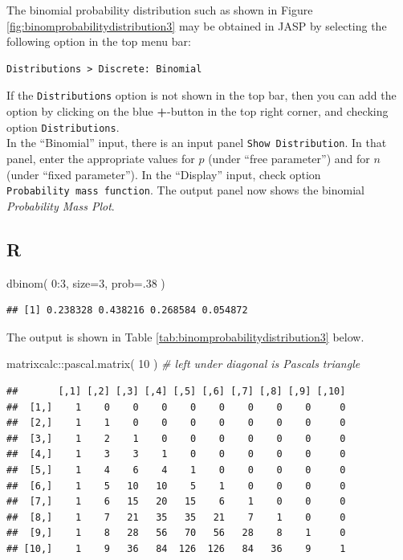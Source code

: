 \documentclass[
]{book}
\newenvironment{Shaded}{\begin{snugshade}}{\end{snugshade}}
\newcommand{\AttributeTok}[1]{\textcolor[rgb]{0.77,0.63,0.00}{#1}}
\newcommand{\CommentTok}[1]{\textcolor[rgb]{0.56,0.35,0.01}{\textit{#1}}}
\newcommand{\DecValTok}[1]{\textcolor[rgb]{0.00,0.00,0.81}{#1}}
\newcommand{\FunctionTok}[1]{\textcolor[rgb]{0.00,0.00,0.00}{#1}}
\newcommand{\NormalTok}[1]{#1}
\newcommand{\SpecialCharTok}[1]{\textcolor[rgb]{0.00,0.00,0.00}{#1}}
\begin{document}
The binomial probability distribution such as shown in Figure \ref{fig:binomprobabilitydistribution3} may be obtained in JASP by selecting the following option in the top menu bar:

\begin{verbatim}
Distributions > Discrete: Binomial
\end{verbatim}

If the \texttt{Distributions} option is not shown in the top bar, then you can add the option by clicking on the blue \textbf{+}-button in the top right corner, and checking option \texttt{Distributions}.\\
In the ``Binomial'' input, there is an input panel \texttt{Show\ Distribution}. In that panel, enter the appropriate values for \(p\) (under ``free parameter'') and for \(n\) (under ``fixed parameter''). In the ``Display'' input, check option \texttt{Probability\ mass\ function}.
The output panel now shows the binomial \emph{Probability Mass Plot}.

\hypertarget{r-4}{%
\subsection{R}\label{r-4}}

\begin{Shaded}
\begin{Highlighting}[]
\FunctionTok{dbinom}\NormalTok{( }\DecValTok{0}\SpecialCharTok{:}\DecValTok{3}\NormalTok{, }\AttributeTok{size=}\DecValTok{3}\NormalTok{, }\AttributeTok{prob=}\NormalTok{.}\DecValTok{38}\NormalTok{ )}
\end{Highlighting}
\end{Shaded}

\begin{verbatim}
## [1] 0.238328 0.438216 0.268584 0.054872
\end{verbatim}

The output is shown in Table \ref{tab:binomprobabilitydistribution3} below.

\begin{Shaded}
\begin{Highlighting}[]
\NormalTok{matrixcalc}\SpecialCharTok{::}\FunctionTok{pascal.matrix}\NormalTok{( }\DecValTok{10}\NormalTok{ ) }\CommentTok{\# left under diagonal is Pascal\textquotesingle{}s triangle}
\end{Highlighting}
\end{Shaded}

\begin{verbatim}
##       [,1] [,2] [,3] [,4] [,5] [,6] [,7] [,8] [,9] [,10]
##  [1,]    1    0    0    0    0    0    0    0    0     0
##  [2,]    1    1    0    0    0    0    0    0    0     0
##  [3,]    1    2    1    0    0    0    0    0    0     0
##  [4,]    1    3    3    1    0    0    0    0    0     0
##  [5,]    1    4    6    4    1    0    0    0    0     0
##  [6,]    1    5   10   10    5    1    0    0    0     0
##  [7,]    1    6   15   20   15    6    1    0    0     0
##  [8,]    1    7   21   35   35   21    7    1    0     0
##  [9,]    1    8   28   56   70   56   28    8    1     0
## [10,]    1    9   36   84  126  126   84   36    9     1
\end{verbatim}
\end{document}

